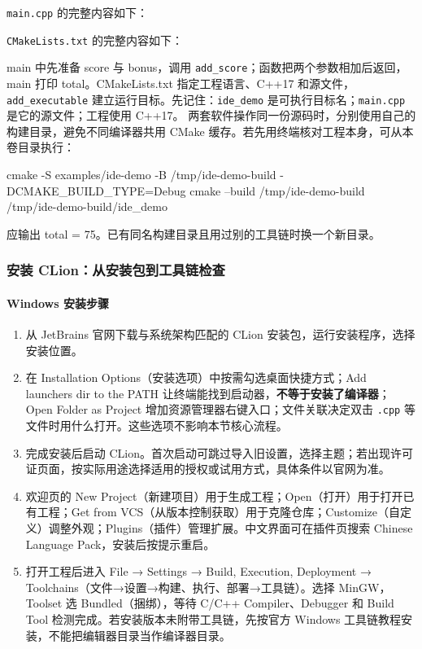 \begin{example}[计分器：预期输出 total = 75]
\texttt{main.cpp} 的完整内容如下：





\texttt{CMakeLists.txt} 的完整内容如下：





main 中先准备 score 与 bonus，调用 \texttt{add\_score}；函数把两个参数相加后返回，main 打印 total。CMakeLists.txt 指定工程语言、C++17 和源文件，\texttt{add\_executable} 建立运行目标。先记住：\texttt{ide\_demo} 是可执行目标名；\texttt{main.cpp} 是它的源文件；工程使用 C++17。
两套软件操作同一份源码时，分别使用自己的构建目录，避免不同编译器共用 CMake 缓存。若先用终端核对工程本身，可从本卷目录执行：


\begin{tbash}
cmake -S examples/ide-demo -B /tmp/ide-demo-build -DCMAKE_BUILD_TYPE=Debug
cmake --build /tmp/ide-demo-build
/tmp/ide-demo-build/ide_demo
\end{tbash}


应输出 total = 75。已有同名构建目录且用过别的工具链时换一个新目录。
\end{example}

\subsubsection{安装 CLion：从安装包到工具链检查}

\paragraph*{Windows 安装步骤}
\begin{enumerate}
\item 从 JetBrains 官网下载与系统架构匹配的 CLion 安装包，运行安装程序，选择安装位置。
\item 在 Installation Options（安装选项）中按需勾选桌面快捷方式；Add launchers dir to the PATH 让终端能找到启动器，\textbf{不等于安装了编译器}；Open Folder as Project 增加资源管理器右键入口；文件关联决定双击 \texttt{.cpp} 等文件时用什么打开。这些选项不影响本节核心流程。
\item 完成安装后启动 CLion。首次启动可跳过导入旧设置，选择主题；若出现许可证页面，按实际用途选择适用的授权或试用方式，具体条件以官网为准。
\item 欢迎页的 New Project（新建项目）用于生成工程；Open（打开）用于打开已有工程；Get from VCS（从版本控制获取）用于克隆仓库；Customize（自定义）调整外观；Plugins（插件）管理扩展。中文界面可在插件页搜索 Chinese Language Pack，安装后按提示重启。
\item 打开工程后进入 File → Settings → Build, Execution, Deployment → Toolchains（文件→设置→构建、执行、部署→工具链）。选择 MinGW，Toolset 选 Bundled（捆绑），等待 C/C++ Compiler、Debugger 和 Build Tool 检测完成。若安装版本未附带工具链，先按官方 Windows 工具链教程安装，不能把编辑器目录当作编译器目录。
\end{enumerate}

